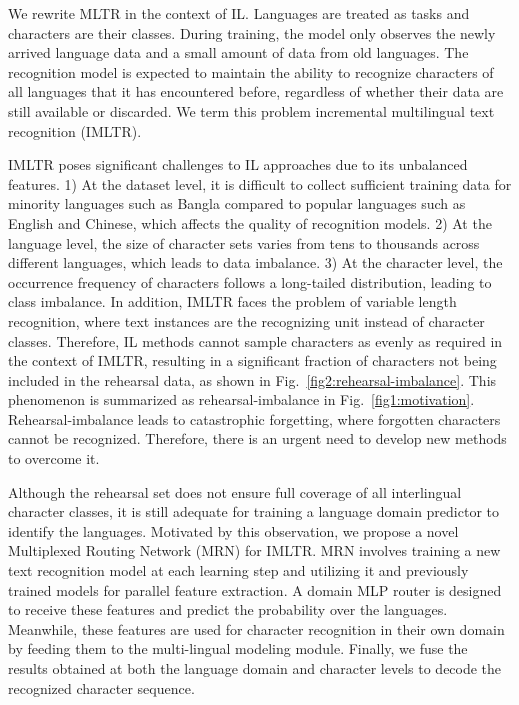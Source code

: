 \documentclass[10pt,twocolumn,letterpaper]{article}
\begin{document}
We rewrite MLTR in the context of IL. Languages are treated as tasks and characters are their classes. During training, the model only observes the newly arrived language data and a small amount of data from old languages. The recognition model is expected to maintain the ability to recognize characters of all languages that it has encountered before, regardless of whether their data are still available or discarded. We term this problem incremental multilingual text recognition (IMLTR).





IMLTR poses significant challenges to IL approaches due to its unbalanced features. 1) At the dataset level, it is difficult to collect sufficient training data for minority languages such as Bangla compared to popular languages such as English and Chinese, which affects the quality of recognition models. 2) At the language level, the size of character sets varies from tens to thousands across different languages, which leads to data imbalance. 3) At the character level, the occurrence frequency of characters follows a long-tailed distribution, leading to class imbalance. In addition, IMLTR faces the problem of variable length recognition, where text instances are the recognizing unit instead of character classes. Therefore, IL methods cannot sample characters as evenly as required in the context of IMLTR, resulting in a significant fraction of characters not being included in the rehearsal data, as shown in Fig.~\ref{fig2:rehearsal-imbalance}. This phenomenon is summarized as rehearsal-imbalance in Fig.~\ref{fig1:motivation}. Rehearsal-imbalance leads to catastrophic forgetting, where forgotten characters cannot be recognized. Therefore, there is an urgent need to develop new methods to overcome it.

Although the rehearsal set does not ensure full coverage of all interlingual character classes, it is still adequate for training a language domain predictor to identify the languages. Motivated by this observation, we propose a novel Multiplexed Routing Network (MRN) for IMLTR. MRN involves training a new text recognition model at each learning step and utilizing it and previously trained models for parallel feature extraction. A domain MLP router is designed to receive these features and predict the probability over the languages. Meanwhile, these features are used for character recognition in their own domain by feeding them to the multi-lingual modeling module. Finally, we fuse the results obtained at both the language domain and character levels to decode the recognized character sequence.
\end{document}
